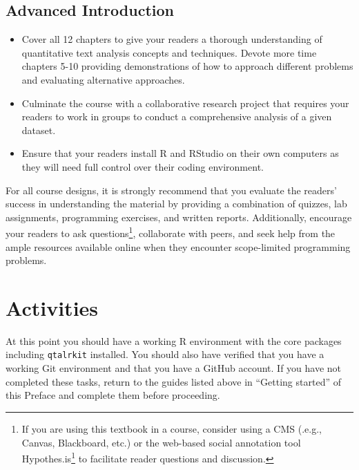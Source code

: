 \documentclass[
  letterpaper,
]{latex/krantz}
\providecommand{\tightlist}{%
  \setlength{\itemsep}{0pt}\setlength{\parskip}{0pt}}\usepackage{longtable,booktabs,array}
\DeclareRobustCommand{\href}[2]{#2\footnote{\url{#1}}}
\begin{document}
\hypertarget{advanced-introduction}{%
\subsection*{Advanced Introduction}\label{advanced-introduction}}

\begin{itemize}
\tightlist
\item
  Cover all 12 chapters to give your readers a thorough understanding of
  quantitative text analysis concepts and techniques. Devote more time
  chapters 5-10 providing demonstrations of how to approach different
  problems and evaluating alternative approaches.
\item
  Culminate the course with a collaborative research project that
  requires your readers to work in groups to conduct a comprehensive
  analysis of a given dataset.
\item
  Ensure that your readers install R and RStudio on their own computers
  as they will need full control over their coding environment.
\end{itemize}

For all course designs, it is strongly recommend that you evaluate the
readers' success in understanding the material by providing a
combination of quizzes, lab assignments, programming exercises, and
written reports. Additionally, encourage your readers to ask
questions\footnote{If you are using this textbook in a course, consider
  using a CMS (.e.g., Canvas, Blackboard, etc.) or the web-based social
  annotation tool \href{https://hypothes.is/}{Hypothes.is} to facilitate
  reader questions and discussion.}, collaborate with peers, and seek
help from the ample resources available online when they encounter
scope-limited programming problems.

\hypertarget{activities}{%
\section*{Activities}\label{activities}}


At this point you should have a working R environment with the core
packages including \texttt{qtalrkit} installed. You should also have
verified that you have a working Git environment and that you have a
GitHub account. If you have not completed these tasks, return to the
guides listed above in ``Getting started'' of this Preface and complete
them before proceeding.
\end{document}
